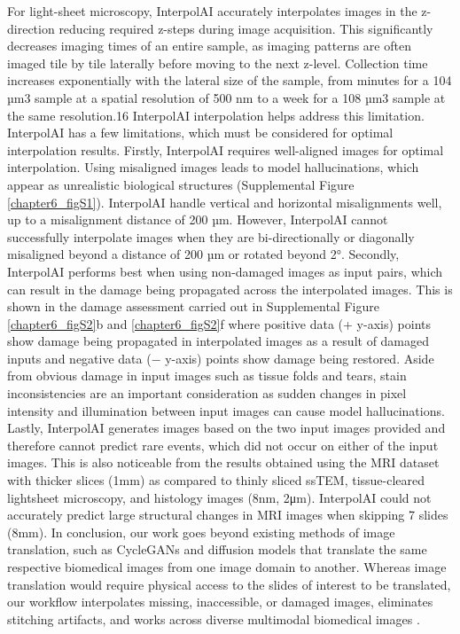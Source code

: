 \begin{refsection}
    For light-sheet microscopy, InterpolAI accurately interpolates images in the z-direction reducing required z-steps during image acquisition. This significantly decreases imaging times of an entire sample, as imaging patterns are often imaged tile by tile laterally before moving to the next z-level. Collection time increases exponentially with the lateral size of the sample, from minutes for a 104 µm3 sample at a spatial resolution of 500 nm to a week for a 108 µm3 sample at the same resolution.16 InterpolAI interpolation helps address this limitation. 
    InterpolAI has a few limitations, which must be considered for optimal interpolation results. Firstly, InterpolAI requires well-aligned images for optimal interpolation. Using misaligned images leads to model hallucinations, which appear as unrealistic biological structures (Supplemental Figure \ref{chapter6_figS1}). InterpolAI handle vertical and horizontal misalignments well, up to a misalignment distance of 200 µm. However, InterpolAI cannot successfully interpolate images when they are bi-directionally or diagonally misaligned beyond a distance of 200 µm or rotated beyond 2°. Secondly, InterpolAI performs best when using non-damaged images as input pairs, which can result in the damage being propagated across the interpolated images. This is shown in the damage assessment carried out in Supplemental Figure \ref{chapter6_figS2}b and \ref{chapter6_figS2}f where positive data (+ y-axis) points show damage being propagated in interpolated images as a result of damaged inputs and negative data (− y-axis) points show damage being restored. Aside from obvious damage in input images such as tissue folds and tears, stain inconsistencies are an important consideration as sudden changes in pixel intensity and illumination between input images can cause model hallucinations. Lastly, InterpolAI generates images based on the two input images provided and therefore cannot predict rare events, which did not occur on either of the input images. This is also noticeable from the results obtained using the MRI dataset with thicker slices (1mm) as compared to thinly sliced ssTEM, tissue-cleared lightsheet microscopy, and histology images (8nm, 2μm). InterpolAI could not accurately predict large structural changes in MRI images when skipping 7 slides (8mm).
    In conclusion, our work goes beyond existing methods of image translation, such as CycleGANs and diffusion models that translate the same respective biomedical images from one image domain to another. Whereas image translation would require physical access to the slides of interest to be translated, our workflow interpolates missing, inaccessible, or damaged images, eliminates stitching artifacts, and works across diverse multimodal biomedical images .
    

\end{refsection}
